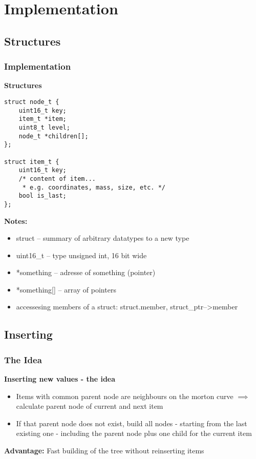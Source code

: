 \section{Implementation}
\subsection{Structures}
\begin{frame}[fragile]
    \frametitle{Implementation}
    \textbf{Structures}
    \begin{verbatim}
struct node_t {
    uint16_t key;
    item_t *item;
    uint8_t level;
    node_t *children[];
};

struct item_t {
    uint16_t key;
    /* content of item...
     * e.g. coordinates, mass, size, etc. */
    bool is_last;
};
    \end{verbatim}
\end{frame}

\begin{frame}
    \textbf{Notes:}
    \begin{itemize}
        \item struct -- summary of arbitrary datatypes to a new type \\
        \item uint16\_t -- type unsigned int, 16 bit wide \\
        \item *something -- adresse of something (pointer) \\
        \item *something[] -- array of pointers
        \item accessesing members of a struct: struct.member,
            struct\_ptr-->member
    \end{itemize}
\end{frame}


\subsection{Inserting}
\subsubsection*{The Idea}
\begin{frame}
    \textbf{Inserting new values - the idea}
    \begin{itemize}
        \item Items with common parent node are neighbours on the morton curve
            $\implies$ calculate parent node of current and next item \\
        \item If that parent node does not exist, build all nodes - starting from
            the last existing one - including the parent node plus one child
            for the current item
    \end{itemize}
    \textbf{Advantage:} Fast building of the tree without reinserting items
\end{frame}

